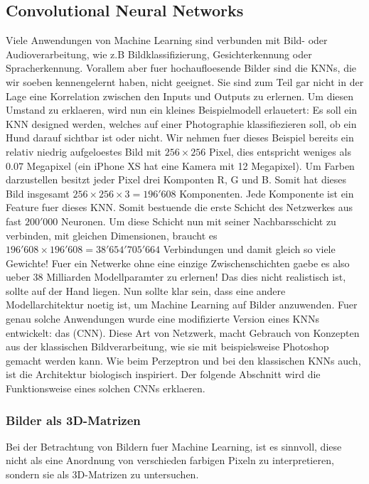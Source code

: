 \documentclass[../main]{subfiles}
\begin{document}
\subsection{Convolutional Neural Networks}
Viele Anwendungen von Machine Learning sind verbunden mit Bild- oder
Audioverarbeitung, wie z.B Bildklassifizierung, Gesichterkennung oder
Spracherkennung.
Vorallem aber fuer hochaufloesende Bilder sind die KNNs, die wir soeben
kennengelernt haben, nicht geeignet. Sie sind zum Teil gar nicht in der
Lage eine Korrelation zwischen den Inputs und Outputs zu erlernen.
Um diesen Umstand zu erklaeren, wird nun ein kleines Beispielmodell erlauetert:
\para
Es soll ein KNN designed werden, welches auf einer Photographie klassifiezieren
soll, ob ein Hund darauf sichtbar ist oder nicht. Wir nehmen fuer dieses
Beispiel bereits ein relativ niedrig aufgeloestes Bild mit $256 \times 256$
Pixel, dies entspricht weniges als $0.07$ Megapixel (ein iPhone XS hat eine Kamera mit
12 Megapixel). Um Farben darzustellen besitzt jeder Pixel drei Komponten R, G
und B. Somit hat dieses Bild insgesamt $256 \times 256 \times 3 = 196'608$
Komponenten. Jede Komponente ist ein Feature fuer dieses KNN. Somit bestuende
die erste Schicht des Netzwerkes aus fast $200'000$ Neuronen. Um diese Schicht
nun mit seiner Nachbarsschicht zu verbinden, mit gleichen Dimensionen, braucht
es $196'608 \times 196'608 = 38'654'705'664$ Verbindungen und damit gleich so
viele Gewichte! Fuer ein Netwerke ohne eine einzige Zwischenschichten gaebe es
also ueber 38 Milliarden Modellparamter zu erlernen! Das dies nicht realistisch ist,
sollte auf der Hand liegen.
\para
Nun sollte klar sein, dass eine andere Modellarchitektur noetig ist, um Machine
Learning auf Bilder anzuwenden. Fuer genau solche Anwendungen wurde eine modifizierte
Version eines KNNs entwickelt: das  (CNN).
Diese Art von Netzwerk, macht Gebrauch von Konzepten aus der klassischen
Bildverarbeitung, wie sie mit beispielsweise Photoshop gemacht werden kann.
Wie beim Perzeptron und bei den klassischen KNNs auch, ist die Architektur
biologisch inspiriert.
Der folgende Abschnitt wird die Funktionsweise eines solchen CNNs erklaeren.


\subsubsection{Bilder als 3D-Matrizen}
Bei der Betrachtung von Bildern fuer Machine Learning, ist es sinnvoll, diese
nicht als eine Anordnung von verschieden farbigen Pixeln zu interpretieren,
sondern sie als 3D-Matrizen zu untersuchen.
\end{document}
